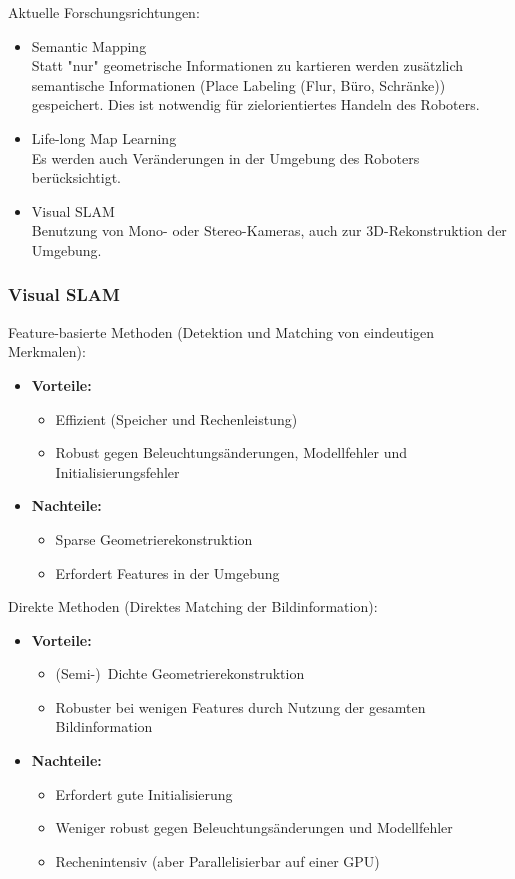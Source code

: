				Aktuelle Forschungsrichtungen:
				\begin{itemize}
					\item Semantic Mapping \\ Statt "nur" geometrische Informationen zu kartieren werden zusätzlich semantische Informationen (\zB Place Labeling (Flur, Büro, Schränke)) gespeichert. Dies ist notwendig für zielorientiertes Handeln des Roboters.
					\item Life-long Map Learning \\ Es werden auch Veränderungen in der Umgebung des Roboters berücksichtigt.
					\item Visual SLAM \\ Benutzung von Mono- oder Stereo-Kameras, auch zur 3D-Rekonstruktion der Umgebung.
				\end{itemize}

			\subsubsection{Visual SLAM}
				Feature-basierte Methoden (Detektion und Matching von eindeutigen Merkmalen):
				\begin{itemize}
					\item \textbf{Vorteile:}
						\begin{itemize}
							\item Effizient (Speicher und Rechenleistung)
							\item Robust gegen Beleuchtungsänderungen, Modellfehler und Initialisierungsfehler
						\end{itemize}
					\item \textbf{Nachteile:}
						\begin{itemize}
							\item Sparse Geometrierekonstruktion
							\item Erfordert Features in der Umgebung
						\end{itemize}
				\end{itemize}

				Direkte Methoden (Direktes Matching der Bildinformation):
				\begin{itemize}
					\item \textbf{Vorteile:}
						\begin{itemize}
							\item (Semi-)~Dichte Geometrierekonstruktion
							\item Robuster bei wenigen Features durch Nutzung der gesamten Bildinformation
						\end{itemize}
					\item \textbf{Nachteile:}
						\begin{itemize}
							\item Erfordert gute Initialisierung
							\item Weniger robust gegen Beleuchtungsänderungen und Modellfehler
							\item Rechenintensiv (aber Parallelisierbar auf einer GPU)
						\end{itemize}
				\end{itemize}

